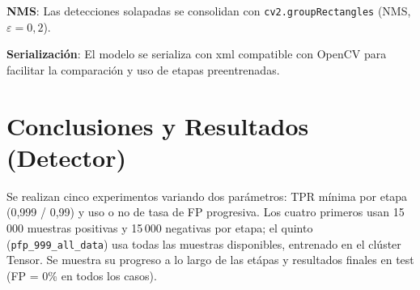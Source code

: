 \documentclass[11pt,spanish,listoffigures,listoftables]{tfgetsinf}
\begin{document}
\textbf{NMS}: Las detecciones solapadas se consolidan con \texttt{cv2.groupRectangles} (NMS, $\varepsilon=0{,}2$).

\textbf{Serialización}: El modelo se serializa con xml compatible con OpenCV para facilitar la comparación y uso de etapas preentrenadas.


\chapter{Conclusiones y Resultados (Detector)}


Se realizan cinco experimentos variando dos parámetros: TPR mínima por etapa (0{,}999 / 0{,}99) y uso o no de tasa de FP progresiva. Los cuatro primeros usan 15\,000 muestras positivas y 15\,000 negativas por etapa; el quinto (\texttt{pfp\_999\_all\_data}) usa todas las muestras disponibles, entrenado en el clúster Tensor. Se muestra su progreso a lo largo de las etápas y resultados finales en test (FP = 0\% en todos los casos).

\end{document}
